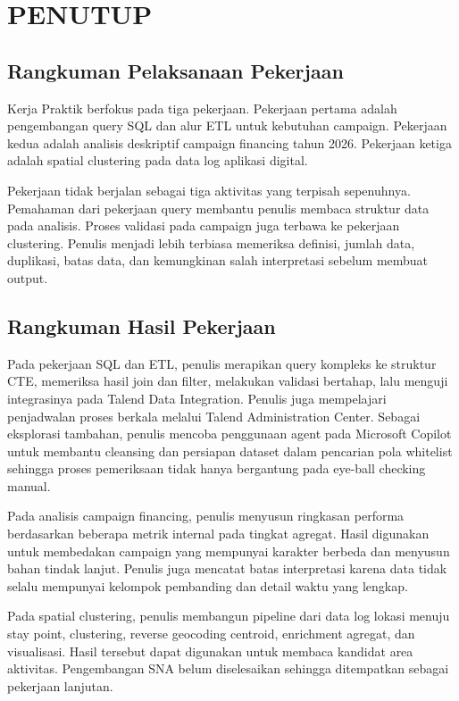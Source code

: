 \cleardoublepage
\chapter{PENUTUP}
\label{chap:penutup}

\section{Rangkuman Pelaksanaan Pekerjaan}
Kerja Praktik berfokus pada tiga pekerjaan. Pekerjaan pertama adalah pengembangan query SQL dan alur ETL untuk kebutuhan campaign. Pekerjaan kedua adalah analisis deskriptif campaign financing tahun 2026. Pekerjaan ketiga adalah spatial clustering pada data log aplikasi digital.

Pekerjaan tidak berjalan sebagai tiga aktivitas yang terpisah sepenuhnya. Pemahaman dari pekerjaan query membantu penulis membaca struktur data pada analisis. Proses validasi pada campaign juga terbawa ke pekerjaan clustering. Penulis menjadi lebih terbiasa memeriksa definisi, jumlah data, duplikasi, batas data, dan kemungkinan salah interpretasi sebelum membuat output.

\section{Rangkuman Hasil Pekerjaan}
Pada pekerjaan SQL dan ETL, penulis merapikan query kompleks ke struktur CTE, memeriksa hasil join dan filter, melakukan validasi bertahap, lalu menguji integrasinya pada Talend Data Integration. Penulis juga mempelajari penjadwalan proses berkala melalui Talend Administration Center. Sebagai eksplorasi tambahan, penulis mencoba penggunaan agent pada Microsoft Copilot untuk membantu cleansing dan persiapan dataset dalam pencarian pola whitelist sehingga proses pemeriksaan tidak hanya bergantung pada eye-ball checking manual.

Pada analisis campaign financing, penulis menyusun ringkasan performa berdasarkan beberapa metrik internal pada tingkat agregat. Hasil digunakan untuk membedakan campaign yang mempunyai karakter berbeda dan menyusun bahan tindak lanjut. Penulis juga mencatat batas interpretasi karena data tidak selalu mempunyai kelompok pembanding dan detail waktu yang lengkap.

Pada spatial clustering, penulis membangun pipeline dari data log lokasi menuju stay point, clustering, reverse geocoding centroid, enrichment agregat, dan visualisasi. Hasil tersebut dapat digunakan untuk membaca kandidat area aktivitas. Pengembangan SNA belum diselesaikan sehingga ditempatkan sebagai pekerjaan lanjutan.

